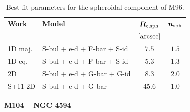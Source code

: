 \documentclass[preprint2]{emulateapj}
\begin{document}
  \begin{table}[h]
  \small
  \caption{Best-fit parameters for the spheroidal component of M96.}
  \begin{center}
  \begin{tabular}{llcc}
  \hline
  {\bf Work} & {\bf Model}   & $\bm R_{\rm e,sph}$    & $\bm n_{\rm sph}$ \\
    &  &  $[\rm arcsec]$ & \\
  \hline
  1D maj. & S-bul + e-d + F-bar + S-id  & $7.5$  &  $1.5$ \\
  1D eq.  & S-bul + e-d + F-bar + S-id  & $5.3$  &  $1.3$ \\
  2D      & S-bul + e-d + G-bar + G-id  & $8.3$  &  $2.0$ \\
  \hline
  S+11 2D         & S-bul + e-d + G-bar  & $45.6$  &  $1.0$ \\
  \hline
  \end{tabular}
  \end{center}
  \label{tab:m96}
  \end{table}


  \clearpage\newpage\noindent

  {\bf M104 -- NGC 4594 \\} 
\end{document}
